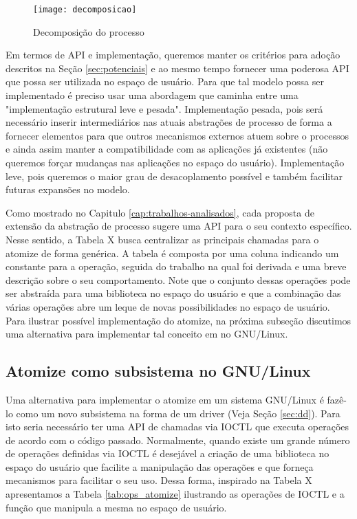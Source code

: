 \begin{figure}[!h]
  \centering
  \texttt{[image: decomposicao]}
  \caption{Decomposição do processo}
  \label{fig:decomposicao_proc}
\end{figure}

Em termos de API e implementação, queremos manter os critérios para adoção
descritos na Seção \ref{sec:potenciais} e ao mesmo tempo fornecer uma poderosa
API que possa ser utilizada no espaço de usuário. Para que tal modelo possa ser
implementado é preciso usar uma abordagem que caminha entre uma "implementação
estrutural leve e pesada". Implementação pesada, pois será necessário inserir
intermediários nas atuais abstrações de processo de forma a fornecer elementos
para que outros mecanismos externos atuem sobre o processos e ainda assim
manter a compatibilidade com as aplicações já existentes (não queremos forçar
mudanças nas aplicações no espaço do usuário). Implementação leve, pois
queremos o maior grau de desacoplamento possível e também facilitar futuras
expansões no modelo.

Como mostrado no Capitulo \ref{cap:trabalhos-analisados}, cada proposta de
extensão da abstração de processo sugere uma API para o seu contexto
específico. Nesse sentido, a Tabela X busca centralizar as principais chamadas
para o atomize de forma genérica. A tabela é composta por uma coluna indicando
um constante para a operação, seguida do trabalho na qual foi derivada e uma
breve descrição sobre o seu comportamento. Note que o conjunto dessas operações
pode ser abstraída para uma biblioteca no espaço do usuário e que a combinação
das várias operações abre um leque de novas possibilidades no espaço de
usuário. Para ilustrar possível implementação do atomize, na próxima subseção
discutimos uma alternativa para implementar tal conceito em no GNU/Linux.



\subsection{Atomize como subsistema no GNU/Linux}

Uma alternativa para implementar o atomize em um sistema GNU/Linux é fazê-lo
como um novo subsistema na forma de um driver (Veja Seção \ref{sec:dd}). Para
isto seria necessário ter uma API de chamadas via IOCTL que executa operações
de acordo com o código passado. Normalmente, quando existe um grande número de
operações definidas via IOCTL é desejável a criação de uma biblioteca no espaço
do usuário que facilite a manipulação das operações e que forneça mecanismos
para facilitar o seu uso. Dessa forma, inspirado na Tabela X apresentamos a
Tabela \ref{tab:ops_atomize} ilustrando as operações de IOCTL e a função que
manipula a mesma no espaço de usuário.


